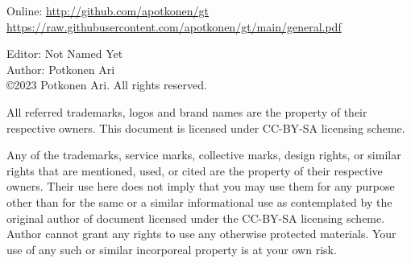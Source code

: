 %
%
%
\label{rights}
\vspace*{\fill}
Online: \url{http://github.com/apotkonen/gt} \\ %
{\scriptsize\url{https://raw.githubusercontent.com/apotkonen/gt/main/general.pdf}}
\vspace*{\fill}

Editor: Not Named Yet\\
Author: Potkonen Ari\\
\copyright 2023 Potkonen Ari. All rights reserved.
\vspace{\baselineskip}
%
%

All referred trademarks, logos and brand names are the property of their respective owners. This document is licensed under CC-BY-SA licensing scheme.
\vspace{\baselineskip}

Any of the trademarks, service marks, collective marks, design rights, or similar rights that are mentioned, used, or cited are the property of their respective owners. Their use here does not imply that you may use them for any purpose other than for the same or a similar informational use as contemplated by the original author of document licensed under the CC-BY-SA licensing scheme. Author cannot grant any rights to use any otherwise protected materials. Your use of any such or similar incorporeal property is at your own risk. 


